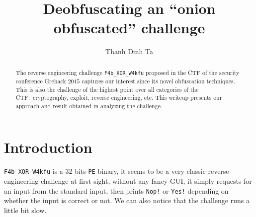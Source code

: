 \documentclass{easychair}
\begin{document}
\title{Deobfuscating an ``onion obfuscated'' challenge}

\author{
  Thanh Dinh Ta
}

\clearpage
\maketitle

\begin{abstract}
  The reverse engineering challenge \texttt{F4b\_XOR\_W4kfu} proposed in the CTF of the security conference Grehack $2015$ captures our interest since its novel obfuscation techniques. This is also the challenge of the highest point over all categories of the CTF:~cryptography, exploit, reverse engineering, etc. This writeup presents our approach and result obtained in analyzing the challenge.
\end{abstract}

\section{Introduction}
\label{sec:introduction}

\texttt{F4b\_XOR\_W4kfu} is a 32 bits \texttt{PE} binary, it seems to be a very classic reverse engineering challenge at first sight, without any fancy GUI, it simply requests for an input from the standard input, then prints \texttt{Nop!} or \texttt{Yes!} depending on whether the input is correct or not. We can also notice that the challenge runs a little bit slow.

\printbibliography
\end{document}
